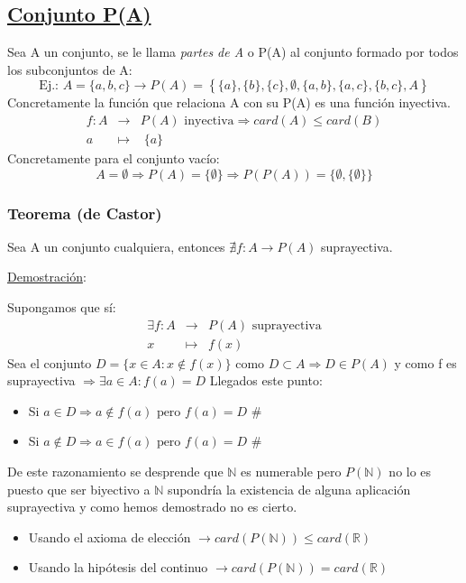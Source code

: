 \documentclass[10pt,a4paper,openright]{book}
\begin{document}
\subsection*{\underline{Conjunto P(A)}}
Sea A un conjunto, se le llama \textit{partes de A} o P(A) al conjunto formado por todos los subconjuntos de A:
$$\mbox{Ej.: } A=\{a,b,c\}\rightarrow P(A)=\left\lbrace \{a\}, \{b\},\{c\}, \emptyset, \{a,b\}, \{a,c\}, \{b,c\}, A \right\rbrace$$
Concretamente la función que relaciona A con su P(A) es una función inyectiva.
\begin{eqnarray*}
f: A & \rightarrow & P(A)\mbox{ inyectiva}\Rightarrow card(A)\leq card(B)\\
a & \longmapsto  & \; \{a\}
\end{eqnarray*}
Concretamente para el conjunto vacío:
$$A=\emptyset \Rightarrow P(A)=\{\emptyset\} \Rightarrow P(P(A))=\{\emptyset, \{\emptyset\}\}$$

\subsubsection*{Teorema (de Castor)}
Sea A un conjunto cualquiera, entonces $\nexists f: A \rightarrow P(A)$  suprayectiva.\par
\underline{Demostración}:\par
Supongamos que sí:
\begin{eqnarray*}
\exists f: A &\rightarrow & P(A)\mbox{ suprayectiva} \\
x & \longmapsto & f(x)
\end{eqnarray*}
Sea el conjunto $D=\{ x\in A: x\notin f(x)\}$ como $D\subset A\Rightarrow D\in P(A)$ y como f es suprayectiva $\Rightarrow \exists a \in A : f(a)=D$
Llegados este punto:
\begin{itemize}
\item Si $a\in D\Rightarrow a\notin f(a)\mbox{ pero }f(a)=D \mbox{ \#}$
\item Si $a\notin D\Rightarrow a\in f(a)\mbox{ pero }f(a)=D \mbox{ \#}$
\end{itemize}

De este razonamiento se desprende que $\mathbb N$ es numerable pero $P(\mathbb N )$ no lo es puesto que ser biyectivo a $\mathbb N$ supondría la existencia de alguna aplicación suprayectiva y como hemos demostrado no es cierto.
\begin{itemize}
\item Usando el axioma de elección $\rightarrow card(P(\mathbb N))\leq card (\mathbb R)$
\item Usando la hipótesis del continuo $\rightarrow card(P(\mathbb N))= card (\mathbb R)$
\end{itemize}
\end{document}
